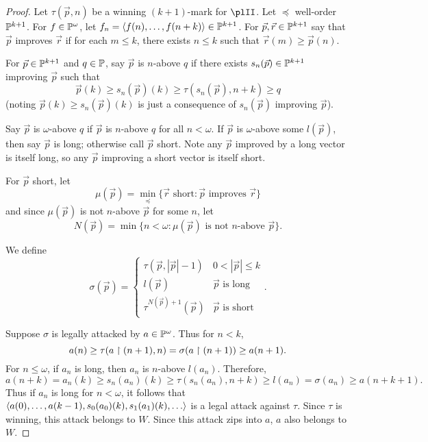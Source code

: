 \documentclass[11pt]{article}
\theoremstyle{plain}
\theoremstyle{definition}
\theoremstyle{remark}
\theoremstyle{plain}
\theoremstyle{definition}
\theoremstyle{remark}
\begin{document}
  \begin{proof}
    Let \(\tau(\vec p,n)\) be a winning \((k+1)\)-mark for \(\plII\).
    Let \(\preceq\) well-order \(\mathbb{P}^{k+1}\).
    For \(f\in\mathbb{P}^\omega\), let
    \(f_n=\langle f(n),\dots,f(n+k)\rangle\in\mathbb{P}^{k+1}\).
    For \(\vec p,\vec r\in\mathbb{P}^{k+1}\) say that \(\vec p\) improves \(\vec r\)
    if for each \(m\leq k\), there exists \(n\leq k\) such that
    \(\vec r(m)\geq\vec p(n)\).

    For \(\vec p\in \mathbb{P}^{k+1}\) and \(q\in\mathbb{P}\), say \(\vec p\) is
    \(n\)-above \(q\) if there exists \(s_n(\vec p)\in\mathbb{P}^{k+1}\)
    improving \(\vec p\)
    such that
    \[
      \vec p(k)
    \geq
      s_n(\vec p)(k)
    \geq
      \tau(s_n(\vec p),n+k)
    \geq
      q
    \]
    (noting \(\vec p(k)\geq s_n(\vec p)(k)\) is just a consequence of
    \(s_n(\vec p)\) improving \(\vec p\)).


    Say \(\vec p\) is \(\omega\)-above \(q\) if \(\vec p\) is \(n\)-above
    \(q\) for all \(n<\omega\). If \(\vec p\) is \(\omega\)-above some
    \(l(\vec p)\), then say \(\vec p\) is long; otherwise call \(\vec p\)
    short. Note any \(\vec p\) improved by a long vector is itself long,
    so any \(\vec p\) improving a short vector is itself short.

    For \(\vec p\) short, let
    \[
      \mu(\vec p)
        =
      \min_{\preceq}\{
        \vec r\text{ short}
          :
        \vec{p}\text{ improves }\vec{r}
      \}
    \]
    and since \(\mu(\vec p)\) is not \(n\)-above \(\vec p\) for some \(n\), let
    \[
      N(\vec p)
        =
      \min\{
        n<\omega
      :
        \mu(\vec p)\text{ is not }n\text{-above }\vec p
      \}
    .\]

    We define
    \[
      \sigma(\vec p)
        =
      \begin{cases}
        \tau(\vec p,|\vec p|-1) & 0<|\vec p|\leq k \\
        l(\vec p) & \vec p \text{ is long} \\
        \tau^{N(\vec p)+1}(\vec p) & \vec p \text{ is short}
     \end{cases}
    .\]

    Suppose \(\sigma\) is legally attacked by \(a\in\mathbb{P}^\omega\).
    Thus for \(n<k\),
    \[
      a(n)
        \geq
      \tau(a\restriction(n+1),n)
        =
      \sigma(a\restriction(n+1))
        \geq
      a(n+1)
    .\]
    For \(n\leq\omega\), if \(a_n\) is long, then \(a_n\) is \(n\)-above
    \(l(a_n)\). Therefore,
    \[
      a(n+k)
        =
      a_n(k)
        \geq
      s_n(a_n)(k)
        \geq
      \tau(s_n(a_n),n+k)
        \geq
      l(a_n)
        =
      \sigma(a_n)
        \geq
      a(n+k+1)
    .\]
    Thus if \(a_n\) is long for \(n<\omega\), it follows that  \(\<a(0),\dots,a(k-1),s_0(a_0)(k),s_1(a_1)(k),\dots\>\)
    is a legal attack against \(\tau\). Since \(\tau\) is winning,
    this attack belongs to \(W\). Since this attack zips into \(a\),
    \(a\) also belongs to \(W\).


\end{proof}
\end{document}
